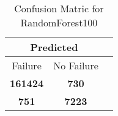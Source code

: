 \begin{table}[] 
\caption{Confusion Matric for RandomForest100} 
\label{Table: Prediction Accuracy-NoneRandomForest10075.0EKF-ignoreReflection-Reflection} 
\centering 
\begin{tabular} 
 {@{}ccc@{}} 
\toprule 
\multicolumn{2}{c}{\textbf{Predicted}}
 \\ \midrule 
\multicolumn{1}{|c|}{Failure} & 
\multicolumn{1}{c|}{No Failure}
 \\ \midrule 
\multicolumn{1}{|c|}{\color{green}\textbf{161424}} & 
\multicolumn{1}{c|}{\color{red}\textbf{730}}
 \\ \midrule 
\multicolumn{1}{|c|}{\color{red}\textbf{751}} & 
\multicolumn{1}{c|}{\color{green}\textbf{7223}}
 \\ \bottomrule 
\end{tabular} 
\end{table} 
